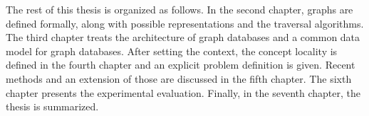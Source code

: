 The rest of this thesis is organized as follows.
In the second chapter, graphs are defined formally, along with possible representations and the traversal algorithms.
The third chapter treats the architecture of graph databases and a common data model for graph databases.
After setting the context, the concept locality is defined in the fourth chapter and an explicit problem definition is given.
Recent methods and an extension of those are discussed in the fifth chapter.
The sixth chapter presents the experimental evaluation.
Finally, in the seventh chapter, the thesis is summarized.
